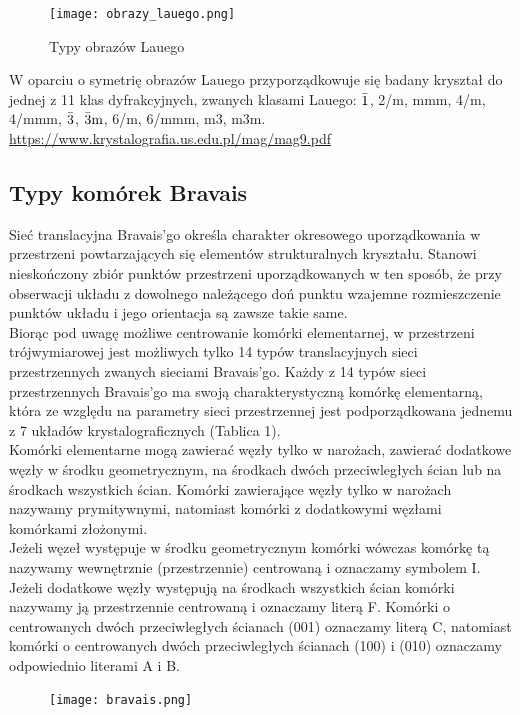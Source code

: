 \documentclass{article}
\begin{document}
\begin{figure}[H]
    \centering
    \texttt{[image: obrazy\_lauego.png]}
    \caption{Typy obrazów Lauego}
    \label{fig:laue}
\end{figure}
W oparciu o symetrię obrazów Lauego przyporządkowuje się badany kryształ do jednej z 11 klas dyfrakcyjnych, zwanych klasami Lauego: $\mathrm{\Bar{1}}$, 2/m, mmm, 4/m, 4/mmm, $\mathrm{\Bar{3}}$, $\mathrm{\Bar{3}m}$, 6/m, 6/mmm, m3, m3m. \\

\url{https://www.krystalografia.us.edu.pl/mag/mag9.pdf}


\subsection{Typy komórek Bravais}

Sieć translacyjna Bravais'go określa charakter okresowego uporządkowania w przestrzeni powtarzających się elementów strukturalnych kryształu. Stanowi nieskończony zbiór punktów przestrzeni uporządkowanych w ten sposób, że przy obserwacji układu z dowolnego należącego doń punktu wzajemne rozmieszczenie punktów układu i jego orientacja są zawsze takie same. \\
Biorąc pod uwagę możliwe centrowanie komórki elementarnej, w przestrzeni trójwymiarowej jest możliwych tylko 14 typów translacyjnych sieci przestrzennych zwanych sieciami Bravais'go. Każdy z 14 typów sieci przestrzennych Bravais'go ma swoją charakterystyczną komórkę elementarną, która ze względu na parametry sieci przestrzennej jest podporządkowana jednemu z 7 układów krystalograficznych (Tablica 1). \\
Komórki elementarne mogą zawierać węzły tylko w narożach, zawierać dodatkowe węzły w środku geometrycznym, na środkach dwóch przeciwległych ścian lub na środkach wszystkich ścian. Komórki zawierające węzły tylko w narożach nazywamy prymitywnymi, natomiast komórki z dodatkowymi węzłami komórkami złożonymi. \\
Jeżeli węzeł występuje w środku geometrycznym komórki wówczas komórkę tą nazywamy wewnętrznie (przestrzennie) centrowaną i oznaczamy symbolem I. Jeżeli dodatkowe węzły występują na środkach wszystkich ścian komórki nazywamy ją przestrzennie centrowaną i oznaczamy literą F. Komórki o centrowanych dwóch przeciwległych ścianach (001) oznaczamy literą C, natomiast komórki o centrowanych dwóch przeciwległych ścianach (100) i (010) oznaczamy odpowiednio literami A i B. 

\begin{figure}[H]
    \centering
    \texttt{[image: bravais.png]}
    \label{fig:kryst}
\end{figure}
\end{document}
